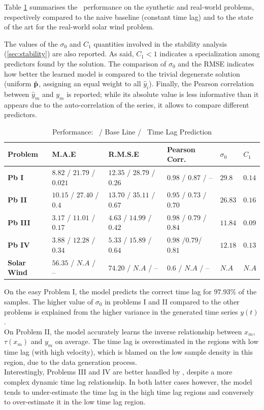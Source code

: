 Table \ref{tab:results_syn} summarises the \XX\ performance on the synthetic and real-world 
problems, respectively compared to the naive baseline (constant time lag) and to the state of the 
art for the real-world solar wind problem. 

The values of the $\sigma_0$ and $C_1$ quantities involved in the stability analysis 
(\cref{sec:stability}) are also reported. As said, $C_1 < 1$ indicates a specialization 
among predictors found by the solution. The comparison of $\sigma_0$ and the RMSE indicates how 
better the learned model is compared to the trivial degenerate solution (uniform $\hat {\bf p}$, 
assigning an equal weight to all $\hat y_i$). Finally, the Pearson correlation between 
$\hat y_m$ and $y_m$ is reported; while its absolute value is less informative than it appears due 
to the auto-correlation of the series, it allows to compare different predictors. 

\begin{table}
  \caption{Performance: \XX  \ / Base Line / \XX  \ Time Lag Prediction}\label{tab:results_syn}
  \centering
  \begin{tabular}{ l l l l l l}
  \hline
  Problem &  M.A.E & R.M.S.E & Pearson Corr. & $\sigma_0$ & $C_1$\\
  \hline
  \textbf{Pb I} & $8.82$ / $21.79$ / $0.021$  & $12.35$ / $28.79$ / $0.26$ & $0.98$ / $0.87$ / -- & $29.8$ & $0.14$\\
  \textbf{Pb II} & $10.15$ / $27.40$ / $0.4$ & $13.70$ / $35.11$ / $0.67$ & $0.95$ / $0.73$ / $0.70$ & $26.83$ & $0.16$\\
  \textbf{Pb III} & $3.17$ / $11.01$ / $0.17$ & $4.63$ / $14.99$ / $0.42$ & $0.98$ / $0.79$ / $0.84$ & $11.84$ & $0.09$\\
  \textbf{Pb IV} & $3.88$ / $12.28$ / $0.34$ & $5.33$ / $15.89$ / $0.64$ & $0.98$ /$0.79$/ $0.81$ & $12.18$ & $0.13$\\
  \textbf{Solar Wind} & $56.35$ / $N.A$ / -- & $74.20$ / $N.A$ / -- & $0.6$ / $N.A$ / -- & $N.A$ & $N.A$\\
  \hline
  \end{tabular}
\end{table}

On the easy Problem I, the model predicts the correct time lag for $97.93\%$ of the samples. The 
higher value of $\sigma_0$ in problems I and II compared to the other problems is explained from 
the higher variance in the generated  time series $y(t)$. \\
On Problem II, the model accurately learns the inverse relationship between $x_m$, $\tau(x_m)$ and 
$y_m$ on average. The time lag is overestimated in the regions with low time lag 
(with high velocity), which is blamed on the low sample density in this region, due to the data 
generation process. \\
Interestingly, Problems III and IV are better handled by \XX, despite a more complex dynamic time 
lag relationship. In both latter cases however, the model tends to under-estimate the time lag in 
the high time lag regions and conversely to over-estimate it in the low time lag region. 

